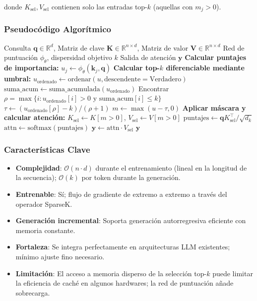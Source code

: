 donde $K_{\text{sel}}, V_{\text{sel}}$ contienen solo las entradas top-$k$ (aquellas con $m_j > 0$).

\subsubsection{Pseudocódigo Algorítmico}

\begin{algorithm}[H]
\caption{SparseK: Atención Top-$k$ Diferenciable}
\begin{algorithmic}[1]
\Require Consulta $\mathbf{q} \in \mathbb{R}^d$, Matriz de clave $\mathbf{K} \in \mathbb{R}^{n \times d}$, Matriz de valor $\mathbf{V} \in \mathbb{R}^{n \times d}$
\Require Red de puntuación $\phi_\theta$, dispersidad objetivo $k$
\Ensure Salida de atención $\mathbf{y}$
\State \textbf{Calcular puntajes de importancia:}
    \State $u_j \gets \phi_\theta(\mathbf{k}_j, \mathbf{q})$
\EndFor
\State \textbf{Calcular top-$k$ diferenciable mediante umbral:}
\State $u_{\text{ordenado}} \gets \text{ordenar}(u, \text{descendente}=\text{Verdadero})$
\State $\text{suma\_acum} \gets \text{suma\_acumulada}(u_{\text{ordenado}})$
\State Encontrar $\rho = \max\{i : u_{\text{ordenado}}[i] > 0 \text{ y suma\_acum}[i] \leq k\}$
\State $\tau \gets (u_{\text{ordenado}}[\rho] - k) / (\rho + 1)$ 
\State $m \gets \max(u - \tau, 0)$ 
\State \textbf{Aplicar máscara y calcular atención:}
\State $K_{\text{sel}} \gets K[m > 0]$, $V_{\text{sel}} \gets V[m > 0]$
\State $\text{puntajes} \gets \mathbf{q} K_{\text{sel}}^\top / \sqrt{d_k}$
\State $\text{attn} \gets \text{softmax}(\text{puntajes})$
\State $\mathbf{y} \gets \text{attn} \cdot V_{\text{sel}}$
\Return $\mathbf{y}$
\end{algorithmic}
\end{algorithm}

\subsubsection{Características Clave}

\begin{itemize}[leftmargin=*]
    \item \textbf{Complejidad}: $\mathcal{O}(n \cdot d)$ durante el entrenamiento (lineal en la longitud de la secuencia); $\mathcal{O}(k)$ por token durante la generación.
    \item \textbf{Entrenable}: Sí; flujo de gradiente de extremo a extremo a través del operador SparseK.
    \item \textbf{Generación incremental}: Soporta generación autorregresiva eficiente con memoria constante.
    \item \textbf{Fortaleza}: Se integra perfectamente en arquitecturas LLM existentes; mínimo ajuste fino necesario.
    \item \textbf{Limitación}: El acceso a memoria disperso de la selección top-$k$ puede limitar la eficiencia de caché en algunos hardwares; la red de puntuación añade sobrecarga.
\end{itemize}

